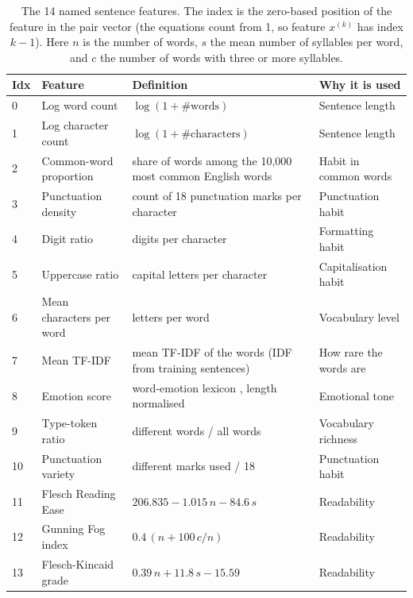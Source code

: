 \documentclass[runningheads]{llncs}
\newcommand{\tablefont}{\scriptsize\setlength{\tabcolsep}{3pt}}
\begin{document}
\begin{table}[t]
\centering
\caption{The 14 named sentence features. The index is the zero-based position of the feature in the pair vector (the equations count from 1, so feature $x^{(k)}$ has index $k-1$). Here $n$ is the number of words, $s$ the mean number of syllables per word, and $c$ the number of words with three or more syllables.}
\label{tab:features}
\tablefont
\begin{tabular}{p{0.5cm}p{2.7cm}p{4.3cm}p{3.5cm}}
\toprule
\textbf{Idx} & \textbf{Feature} & \textbf{Definition} & \textbf{Why it is used} \\
\midrule
0 & Log word count & $\log(1+\#\text{words})$ & Sentence length \cite{10.1093/llc/fqq001} \\
1 & Log character count & $\log(1+\#\text{characters})$ & Sentence length \\
2 & Common-word proportion & share of words among the 10,000 most common English words & Habit in common words \cite{6722273} \\
3 & Punctuation density & count of 18 punctuation marks per character & Punctuation habit \cite{zamir2024stylometry} \\
4 & Digit ratio & digits per character & Formatting habit \\
5 & Uppercase ratio & capital letters per character & Capitalisation habit \\
6 & Mean characters per word & letters per word & Vocabulary level \\
7 & Mean TF-IDF & mean TF-IDF of the words (IDF from training sentences) & How rare the words are \\
8 & Emotion score & word-emotion lexicon \cite{mohammad2013crowdsourcing}, length normalised & Emotional tone \\
9 & Type-token ratio & different words / all words & Vocabulary richness \cite{oloo2022optimal} \\
10 & Punctuation variety & different marks used / 18 & Punctuation habit \\
11 & Flesch Reading Ease & $206.835-1.015\,n-84.6\,s$ & Readability \cite{flesch1948new} \\
12 & Gunning Fog index & $0.4\,(n+100\,c/n)$ & Readability \cite{gunning1952technique} \\
13 & Flesch-Kincaid grade & $0.39\,n+11.8\,s-15.59$ & Readability \cite{kincaid1975derivation} \\
\bottomrule
\end{tabular}
\end{table}
\end{document}
